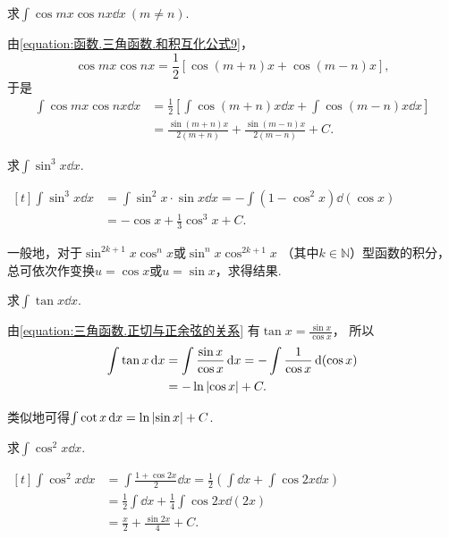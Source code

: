 \begin{example}
求\(\int \cos mx \cos nx \dd{x}\ (m \neq n)\).
\begin{solution}
由\cref{equation:函数.三角函数.和积互化公式9}，
\[
	\cos mx \cos nx
	= \frac12 [\cos(m+n)x + \cos(m-n)x],
\]
于是\begin{align}
	\int \cos mx \cos nx \dd{x}
	&= \frac12 \left[
		\int \cos(m+n)x \dd{x}
		+ \int \cos(m-n)x \dd{x}
	\right]
	\nonumber \\
	&= \frac{\sin(m+n)x}{2(m+n)}
		+ \frac{\sin(m-n)x}{2(m-n)}
		+ C.
\end{align}
\end{solution}
\end{example}

\begin{example}
求\(\int \sin^3 x \dd{x}\).
\begin{solution}
\(\begin{aligned}[t]
	\int \sin^3 x \dd{x}
	&= \int \sin^2 x \cdot \sin x \dd{x}
	= -\int (1 - \cos^2 x) \dd(\cos x) \\
	&= -\cos x + \frac{1}{3} \cos^3 x + C.
\end{aligned}\)
\end{solution}
\end{example}

\begin{remark}
一般地，对于\(\sin^{2k+1} x \cos^n x\)或\(\sin^n x \cos^{2k+1} x\)
（其中\(k\in\mathbb{N}\)）型函数的积分，
总可依次作变换\(u = \cos x\)或\(u = \sin x\)，求得结果.
\end{remark}

\begin{example}
求\(\int \tan x \dd{x}\).
\begin{solution}
由\cref{equation:三角函数.正切与正余弦的关系}
有\(\tan x = \frac{\sin x}{\cos x}\)，
所以\begin{align*}
	\int \tan x \dd{x}
	&= \int \frac{\sin x}{\cos x} \dd{x}
	= - \int \frac{1}{\cos x} \dd(\cos x) \\
	&= - \ln\abs{\cos x} + C.
\end{align*}
\end{solution}
\end{example}

类似地可得\(\int \cot x \dd{x} = \ln\abs{\sin x} + C\).

\begin{example}
求\(\int \cos^2 x \dd{x}\).
\begin{solution}
\(\begin{aligned}[t]
	\int \cos^2 x \dd{x}
	&= \int \frac{1 + \cos 2x}{2} \dd{x}
	= \frac{1}{2} \left( \int \dd{x} + \int \cos 2x \dd{x} \right) \\
	&= \frac{1}{2} \int \dd{x} + \frac{1}{4} \int \cos 2x \dd(2x) \\
	&= \frac{x}{2} + \frac{\sin 2x}{4} + C.
\end{aligned}\)
\end{solution}
\end{example}

